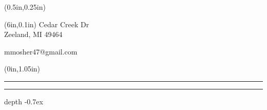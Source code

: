 \newcommand{\Address}{1616 Cedar Creek Dr\\Zeeland, MI 49464}
\newcommand{\Email}{mmosher47@gmail.com}
\newcommand{\Phone}{616.965.1544}
\newcommand{\resline}[1]{%
   \begin{textblock*}{\paperwidth}(0in,{#1})
      \noindent{\rule[0.55ex]{0.5in}{0.4pt}}%
      \rule[1.5pt]{3.82in}{3pt}%
      {\leavevmode\leaders\hrule height 0.7ex depth \dimexpr0.4pt-0.7ex\hfill\kern0pt}
   \end{textblock*}
}

\begin{textblock*}{3.75in}(0.5in,0.25in)
\noindent\colorbox{black}{%
   \color{white}%
}
\color{black}
\end{textblock*}
\begin{textblock*}{2.25in}(6in,0.1in)
\flushright
\Address\par
\Email\par
\end{textblock*}
\resline{1.05in}
